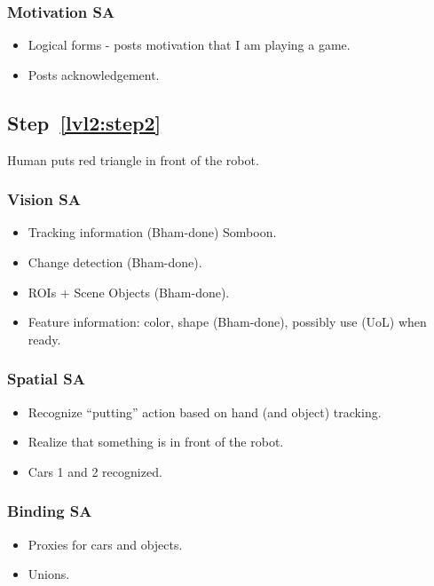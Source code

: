 \documentclass{article}
\begin{document}
\subsubsection{Motivation SA}
\begin{itemize}
\item Logical forms - posts motivation that I am playing a game.
\item Posts acknowledgement.
\end{itemize}

\subsection{Step~\ref{lvl2:step2}}
Human puts red triangle in front of the robot.

\subsubsection{Vision SA}
\begin{itemize}
\item Tracking information (Bham-done) Somboon.
\item Change detection (Bham-done).
\item ROIs + Scene Objects (Bham-done).
\item Feature information: color, shape (Bham-done), possibly use
  (UoL) when ready.
\end{itemize}

\subsubsection{Spatial SA}
\begin{itemize}
\item Recognize ``putting'' action based on hand (and object)
  tracking.
\item Realize that something is in front of the robot.
\item Cars 1 and 2 recognized.
\end{itemize}

\subsubsection{Binding SA}
\begin{itemize}
\item Proxies for cars and objects.
\item Unions.
\end{itemize}
\end{document}
